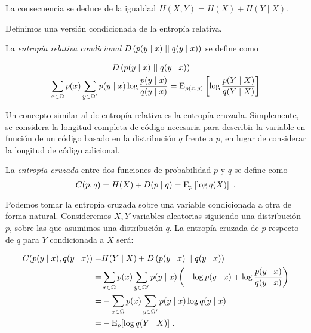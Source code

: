 La consecuencia se deduce de la igualdad \(H(X,Y)=H(X)+H(Y\mid X)\).
\proofe

\theoe

Definimos una versión condicionada de la entropía relativa.

La \emph{entropía relativa condicional}
\(D\left(p(y\mid x)\mid\mid q(y\mid x)\right)\) se define como

\begin{gather*}D\left(p(y\mid x)\mid\mid q(y\mid x)\right)=\\\sum_{x\in\Omega}p(x)\sum_{y\in\Omega'}p(y\mid x)\log\frac{p(y\mid x)}{q(y\mid x)}=\mathrm{E}_{p(x,y)}\left[\log\frac{p(Y\mid X)}{q(Y\mid X)}\right]
\end{gather*}


Un concepto similar al de entropía relativa es la entropía cruzada.
Simplemente, se considera la longitud completa de código necesaria para describir la variable en función de un código basado en la distribución $q$ frente a $p$, en lugar de considerar la longitud de código adicional.

La \emph{entropía cruzada} entre dos funciones de probabilidad \(p\) y
\(q\) se define como
\[C(p, q)=H(X) + D(p\mid q)=\mathrm{E}_p\left[\log q(X)\right]~.\]


\remb
Podemos tomar la entropía cruzada sobre una variable condicionada a otra
de forma natural. Consideremos \(X,Y\) variables aleatorias siguiendo
una distribución \(p\), sobre las que asumimos una distribución \(q\).
La entropía cruzada de \(p\) respecto de \(q\) para \(Y\) condicionada a
\(X\) será:

\begin{align*}
  C(p(y\mid x),q(y \mid x))=&H(Y\mid X) + D\left(p(y\mid x)\mid\mid q(y\mid x)\right)\\
                =&\sum_{x\in\Omega}p(x)\sum_{y\in\Omega'}p(y\mid x)\left(-\log p(y\mid x)
                  +\log\frac{p(y\mid x)}{q(y\mid x)}\right)\\
                =&-\sum_{x\in\Omega}p(x)\sum_{y\in\Omega'}p(y\mid x)\log q(y\mid x)\\
                =&-\mathrm{E}_p[\log q(Y\mid X)]~.
\end{align*}

\reme

